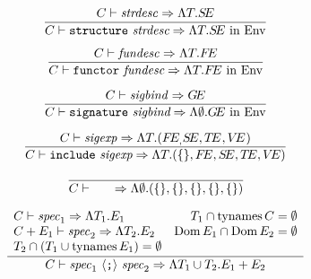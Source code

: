 \begin{equation}        %
\label{structurespec-rule}
\frac{\C\ts\strdesc\ra\LAMBDA{\T}{\SE}
      }
     { \C\ts\structurespec\ra\LAMBDA{\T}{\SE\ \In\ \Env }}
\end{equation}

\begin{equation}        %
\label{funspec-rule}
\frac{\C\ts\fundesc\ra\LAMBDA{\T}{\FE}}
     { \C\ts\functorspec\ra\LAMBDA{\T}{\FE\ \In\ \Env }}
\end{equation}

\begin{equation}	%
\label{signaturespec-rule}
\frac{\C\ts\sigbind\ra\GE }
     {\C\ts\signaturespec\ra\LAMBDA{\emptyset}{\GE\ \In\ \Env}}
\end{equation}

\begin{equation}        %
\label{includespec-rule}
\frac{ \C\ts\sigexp\ra\sig{\T}{\longstr}}
     { \C\ts\includespec\ra\LAMBDA{\T}{(\emptymap,\FE,\SE,\TE,\VE)}}
\end{equation}


\begin{equation}        %
\frac{}
     { \C\ts\emptyspec\ra\LAMBDA{\emptyset}{(\emptymap,\emptymap,\emptymap,\emptymap,\emptymap)}}
\end{equation}

\begin{equation}        %
\label{seqspec-rule}
\frac{ \begin{array}{lr}
       \C\ts\spec_1\ra\LAMBDA{\T_1}{\E_1} &
       \T_1 \cap \TyNamesFcn \C = \emptyset \\
        \C + \E_1 \ts \spec_2 \ra \LAMBDA{\T_2}{\E_2} &
       \Dom \E_1 \cap \Dom \E_2 = \emptyset \\
       \T_2 \cap (\T_1 \cup \TyNamesFcn \E_1) = \emptyset
       \end{array}}
     { \C\ts\seqspec\ra\LAMBDA{\T_1\cup\T_2}{\E_1 + \E_2}}
\end{equation}

